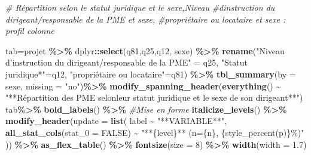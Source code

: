 \documentclass[
]{article}
\newenvironment{Shaded}{\begin{snugshade}}{\end{snugshade}}
\newcommand{\AttributeTok}[1]{\textcolor[rgb]{0.13,0.29,0.53}{#1}}
\newcommand{\CommentTok}[1]{\textcolor[rgb]{0.56,0.35,0.01}{\textit{#1}}}
\newcommand{\ConstantTok}[1]{\textcolor[rgb]{0.56,0.35,0.01}{#1}}
\newcommand{\DecValTok}[1]{\textcolor[rgb]{0.00,0.00,0.81}{#1}}
\newcommand{\FloatTok}[1]{\textcolor[rgb]{0.00,0.00,0.81}{#1}}
\newcommand{\FunctionTok}[1]{\textcolor[rgb]{0.13,0.29,0.53}{\textbf{#1}}}
\newcommand{\NormalTok}[1]{#1}
\newcommand{\OtherTok}[1]{\textcolor[rgb]{0.56,0.35,0.01}{#1}}
\newcommand{\SpecialCharTok}[1]{\textcolor[rgb]{0.81,0.36,0.00}{\textbf{#1}}}
\newcommand{\StringTok}[1]{\textcolor[rgb]{0.31,0.60,0.02}{#1}}
\begin{document}
\begin{Shaded}
\begin{Highlighting}[]
\CommentTok{\# Répartition selon le statut juridique et le sexe,Niveau }
\CommentTok{\#d\textquotesingle{}instruction du dirigeant/responsable de la PME et sexe, }
\CommentTok{\#propriétaire ou locataire et sexe : profil colonne}

\NormalTok{tab}\OtherTok{=}\NormalTok{projet }\SpecialCharTok{\%\textgreater{}\%}
\NormalTok{         dplyr}\SpecialCharTok{::}\FunctionTok{select}\NormalTok{(q81,q25,q12, sexe) }\SpecialCharTok{\%\textgreater{}\%}
           \FunctionTok{rename}\NormalTok{(}\StringTok{"Niveau d’instruction du dirigeant/responsable de la PME"} \OtherTok{=}\NormalTok{ q25, }
             \StringTok{"Statut juridique*"}\OtherTok{=}\NormalTok{q12, }\StringTok{"propriétaire ou locataire"}\OtherTok{=}\NormalTok{q81) }\SpecialCharTok{\%\textgreater{}\%} 
                \FunctionTok{tbl\_summary}\NormalTok{(}\AttributeTok{by =}\NormalTok{ sexe, }\AttributeTok{missing =} \StringTok{"no"}\NormalTok{)}\SpecialCharTok{\%\textgreater{}\%}
                  \FunctionTok{modify\_spanning\_header}\NormalTok{(}\FunctionTok{everything}\NormalTok{() }\SpecialCharTok{\textasciitilde{}} \StringTok{"**Répartition }
\StringTok{                  des PME selonleur statut juridique }
\StringTok{                                         et le sexe de son dirigeant**"}\NormalTok{)}
\NormalTok{tab}\SpecialCharTok{\%\textgreater{}\%} \FunctionTok{bold\_labels}\NormalTok{() }\SpecialCharTok{\%\textgreater{}\%}    \CommentTok{\#Mise en forme}
  \FunctionTok{italicize\_levels}\NormalTok{()  }\SpecialCharTok{\%\textgreater{}\%}    
      \FunctionTok{modify\_header}\NormalTok{(}\AttributeTok{update =} \FunctionTok{list}\NormalTok{( label }\SpecialCharTok{\textasciitilde{}} \StringTok{"**VARIABLE**"}\NormalTok{, }
                                   \FunctionTok{all\_stat\_cols}\NormalTok{(}\AttributeTok{stat\_0 =} \ConstantTok{FALSE}\NormalTok{) }\SpecialCharTok{\textasciitilde{}} \StringTok{"**\{level\}**}
\StringTok{                                   (n=\{n\}, \{style\_percent(p)\}\%)"}\NormalTok{   )) }\SpecialCharTok{\%\textgreater{}\%}  
          \FunctionTok{as\_flex\_table}\NormalTok{() }\SpecialCharTok{\%\textgreater{}\%}   
        \FunctionTok{fontsize}\NormalTok{(}\AttributeTok{size =} \DecValTok{8}\NormalTok{) }\SpecialCharTok{\%\textgreater{}\%}   
            \FunctionTok{width}\NormalTok{(}\AttributeTok{width =} \FloatTok{1.7}\NormalTok{)  }
\end{Highlighting}
\end{Shaded}
\end{document}
